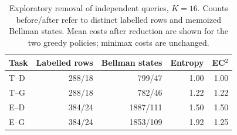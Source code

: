 \begin{table}[htbp]\centering\small
\caption{Exploratory removal of independent queries, $K=16$. Counts before/after refer to distinct labelled rows and memoized Bellman states. Mean costs after reduction are shown for the two greedy policies; minimax costs are unchanged.}\label{tab:domainreduction}
\begin{tabular}{lrrrr}\toprule
Task & Labelled rows & Bellman states & Entropy & EC$^2$ \\ \midrule
T--D & 288/18 & 799/47 & 1.00 & 1.00 \\
T--G & 288/18 & 782/46 & 1.22 & 1.22 \\
E--D & 384/24 & 1887/111 & 1.50 & 1.50 \\
E--G & 384/24 & 1853/109 & 1.92 & 1.25 \\
\bottomrule\end{tabular}
\end{table}
